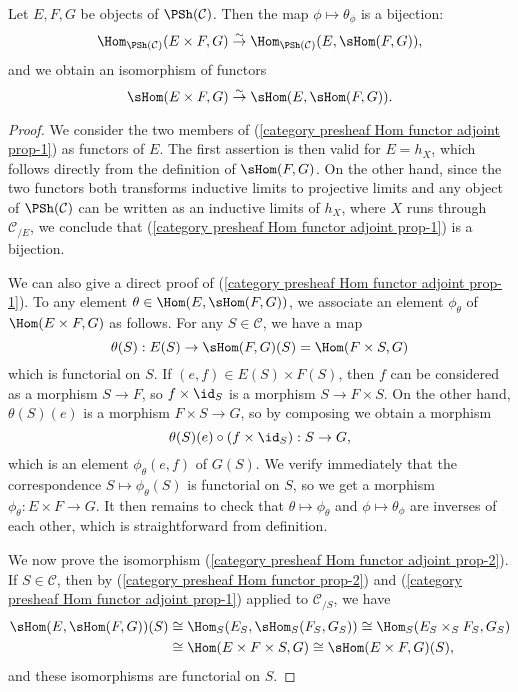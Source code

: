 \begin{proposition}\label{category presheaf Hom functor adjoint prop}
Let $E,F,G$ be objects of $\PSh(\mathcal{C})$. Then the map $\phi\mapsto\theta_\phi$ is a bijection:
\begin{equation}\label{category presheaf Hom functor adjoint prop-1}
\Hom_{\PSh(\mathcal{C})}(E\times F,G)\stackrel{\sim}{\to} \Hom_{\PSh(\mathcal{C})}(E,\sHom(F,G)),
\end{equation}
and we obtain an isomorphism of functors
\begin{equation}\label{category presheaf Hom functor adjoint prop-2}
\sHom(E\times F,G)\stackrel{\sim}{\to} \sHom(E,\sHom(F,G)).
\end{equation}
\end{proposition}
\begin{proof}
We consider the two members of (\ref{category presheaf Hom functor adjoint prop-1}) as functors of $E$. The first assertion is then valid for $E=h_X$, which follows directly from the definition of $\sHom(F,G)$. On the other hand, since the two functors both transforms inductive limits to projective limits and any object of $\PSh(\mathcal{C})$ can be written as an inductive limits of $h_X$, where $X$ runs through $\mathcal{C}_{/E}$, we conclude that (\ref{category presheaf Hom functor adjoint prop-1}) is a bijection.\par
We can also give a direct proof of (\ref{category presheaf Hom functor adjoint prop-1}). To any element $\theta\in\Hom(E,\sHom(F,G))$, we associate an element $\phi_\theta$ of $\Hom(E\times F,G)$ as follows. For any $S\in\mathcal{C}$, we have a map
\[\theta(S):E(S)\to \sHom(F,G)(S)=\Hom(F\times S,G)\]
which is functorial on $S$. If $(e,f)\in E(S)\times F(S)$, then $f$ can be considered as a morphism $S\to F$, so $f\times\id_S$ is a morphism $S\to F\times S$. On the other hand, $\theta(S)(e)$ is a morphism $F\times S\to G$, so by composing we obtain a morphism
\[\theta(S)(e)\circ(f\times\id_S):S\to G,\]
which is an element $\phi_\theta(e,f)$ of $G(S)$. We verify immediately that the correspondence $S\mapsto\phi_\theta(S)$ is functorial on $S$, so we get a morphism $\phi_\theta:E\times F\to G$. It then remains to check that $\theta\mapsto\phi_\theta$ and $\phi\mapsto\theta_\phi$ are inverses of each other, which is straightforward from definition.\par
We now prove the isomorphism (\ref{category presheaf Hom functor adjoint prop-2}). If $S\in\mathcal{C}$, then by (\ref{category presheaf Hom functor prop-2}) and (\ref{category presheaf Hom functor adjoint prop-1}) applied to $\mathcal{C}_{/S}$, we have
\begin{align*}
\sHom(E,\sHom(F,G))(S)&\cong\Hom_S(E_S,\sHom_S(F_S,G_S))\cong\Hom_S(E_S\times_SF_S,G_S)\\
&\cong \Hom(E\times F\times S,G)\cong\sHom(E\times F,G)(S),
\end{align*}
and these isomorphisms are functorial on $S$.
\end{proof}

